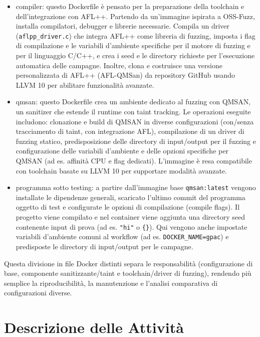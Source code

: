 \begin{itemize}
    \item compiler: questo Dockerfile è pensato per la preparazione della toolchain e dell’integrazione con AFL++. Partendo da un’immagine ispirata a OSS-Fuzz, installa compilatori, debugger e librerie necessarie. Compila un driver (\texttt{aflpp\_driver.c}) che integra AFL++ come libreria di fuzzing, imposta i flag di compilazione e le variabili d’ambiente specifiche per il motore di fuzzing e per il linguaggio C/C++, e crea i seed e le directory richieste per l’esecuzione automatica delle campagne. Inoltre, clona e costruisce una versione personalizzata di AFL++ (AFL-QMSan) da repository GitHub usando LLVM 10 per abilitare funzionalità avanzate.
    
    \item qmsan: questo Dockerfile crea un ambiente dedicato al fuzzing con QMSAN, un sanitizer che estende il runtime con taint tracking. Le operazioni eseguite includono: clonazione e build di QMSAN in diverse configurazioni (con/senza tracciamento di taint, con integrazione AFL), compilazione di un driver di fuzzing statico, predisposizione delle directory di input/output per il fuzzing e configurazione delle variabili d’ambiente e delle opzioni specifiche per QMSAN (ad es. affinità CPU e flag dedicati). L’immagine è resa compatibile con toolchain basate su LLVM 10 per supportare modalità avanzate.
    
    \item programma sotto testing: a partire dall’immagine base \texttt{qmsan:latest} vengono installate le dipendenze generali, scaricato l’ultimo commit del programma oggetto di test e configurate le opzioni di compilazione (compile flags). Il progetto viene compilato e nel container viene aggiunta una directory seed contenente input di prova (ad es. \texttt{"hi"} o \texttt{\{\}}). Qui vengono anche impostate variabili d’ambiente comuni al workflow (ad es. \texttt{DOCKER\_NAME=gpac}) e predisposte le directory di input/output per le campagne.
\end{itemize}



Questa divisione in file Docker distinti separa le responsabilità (configurazione di base, componente sanitizzante/taint e toolchain/driver di fuzzing), rendendo più semplice la riproducibilità, la manutenzione e l'analisi comparativa di configurazioni diverse.


\section{Descrizione delle Attività}

